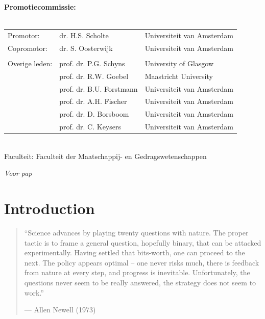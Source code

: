\documentclass[11pt,american,]{memoir} %
\begin{document}
\clearpage
\thispagestyle{empty}
\noindent\textbf{Promotiecommissie:}\\
\\
\noindent\begin{tabular}{@{}lll}

Promotor:
&  dr. H.S. Scholte & Universiteit van Amsterdam\\

Copromotor:
&  dr. S. Oosterwijk & Universiteit van Amsterdam\\

\\
Overige leden:
&  prof. dr. P.G. Schyns & University of Glasgow\\
&  prof. dr. R.W. Goebel & Maastricht University\\
&  prof. dr. B.U. Forstmann & Universiteit van Amsterdam\\
&  prof. dr. A.H. Fischer & Universiteit van Amsterdam\\
&  prof. dr. D. Borsboom & Universiteit van Amsterdam\\
&  prof. dr. C. Keysers & Universiteit van Amsterdam\\
\end{tabular}\\

\noindent Faculteit: Faculteit der Maatschappij- en Gedragswetenschappen

\clearpage
\vspace*{\fill}
\begin{center}
\begin{minipage}{.6\textwidth}
\emph{Voor pap}
\end{minipage}
\end{center}
\vfill %
\cleardoublepage



\clearpage
\thispagestyle{empty}
{
\hypersetup{linkcolor=black}
\setcounter{tocdepth}{1}
\tableofcontents
}
\mainmatter
\hypertarget{general-introduction}{%
\chapter{Introduction}\label{general-introduction}}

\begin{quote}
``Science advances by playing twenty questions with nature.
The proper tactic is to frame a general question, hopefully binary,
that can be attacked experimentally. Having settled that bits-worth,
one can proceed to the next. The policy appears optimal -- one never risks much,
there is feedback from nature at every step, and progress is inevitable.
Unfortunately, the questions never seem to be really answered,
the strategy does not seem to work.''

\hfill --- Allen Newell (1973)
\end{quote}
\end{document}
